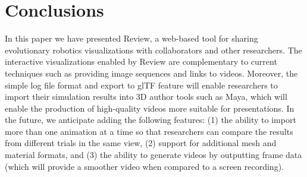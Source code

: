 \section{Conclusions}
\label{sec:conclusions}

In this paper we have presented Review, a web-based tool for sharing evolutionary robotics visualizations with collaborators and other researchers.
%
The interactive visualizations enabled by Review are complementary to current techniques such as providing image sequences and links to videos.
%
Moreover, the simple log file format and export to glTF feature will enable researchers to import their simulation results into 3D author tools such as Maya, which will enable the production of high-quality videos more suitable for presentations.
%
In the future, we anticipate adding the following features: (1) the ability to import more than one animation at a time so that researchers can compare the results from different trials in the same view, (2) support for additional mesh and material formats, and (3) the ability to generate videos by outputting frame data (which will provide a smoother video when compared to a screen recording).
